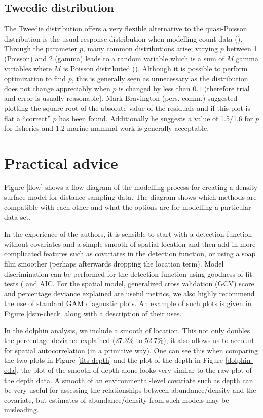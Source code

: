 \documentclass[a4paper,12pt]{article}
\begin{document}
\subsection*{Tweedie distribution}
\label{s:Tweedie}

The Tweedie distribution offers a very flexible alternative to the quasi-Poisson distribution is the usual response distribution when modelling count data (\cite{Candy:2004tb}). Through the parameter $p$, many common distributions arise; varying $p$ between 1 (Poisson) and 2 (gamma) leads to a random variable which is a sum of $M$ gamma variables where $M$ is Poisson distributed (\cite{Jorgensen:1987vg}). Although it is possible to perform optimization to find $p$, this is generally seen as unnecessary as the distribution does not change appreciably when $p$ is changed by less than $0.1$ (therefore trial and error is usually reasonable). Mark Bravington (pers. comm.) suggested plotting the square root of the absolute value of the residuals and if this plot is flat a ``correct'' $p$ has been found. Additionally he suggests a value of 1.5/1.6 for $p$ for fisheries and 1.2 marine mammal work is generally acceptable.


\section*{Practical advice}
\label{s:practical}

Figure \ref{flow} shows a flow diagram of the modelling process for creating a density surface model for distance sampling data. The diagram shows which methods are compatible with each other and what the options are for modelling a particular data set.

In the experience of the authors, it is sensible to start with a detection function without covariates and a simple smooth of spatial location and then add in more complicated features such as covariates in the detection function, or using a soap film smoother (perhaps afterwards dropping the location term). Model discrimination can be performed for the detection function using goodness-of-fit tests (\cite{Buckland:2004ts} and AIC. For the spatial model, generalized cross validation (GCV) score and percentage deviance explained are useful metrics, we also highly recommend the use of standard GAM diagnostic plots. An example of such plots is given in Figure \ref{dsm-check} along with a description of their uses.

In the dolphin analysis, we include a smooth of location. This not only doubles the percentage deviance explained (27.3\% to 52.7\%), it also allows us to account for spatial autocorrelation (in a primitive way). One can see this when comparing the two plots in Figure \ref{fits-depth} and the plot of the depth in Figure \ref{dolphin-eda}, the plot of the smooth of depth alone looks very similar to the raw plot of the depth data. A smooth of an environmental-level covariate such as depth can be very useful for assessing the relationships between abundance/density and the covariate, but estimates of abundance/density from such models may be misleading.
\end{document}
